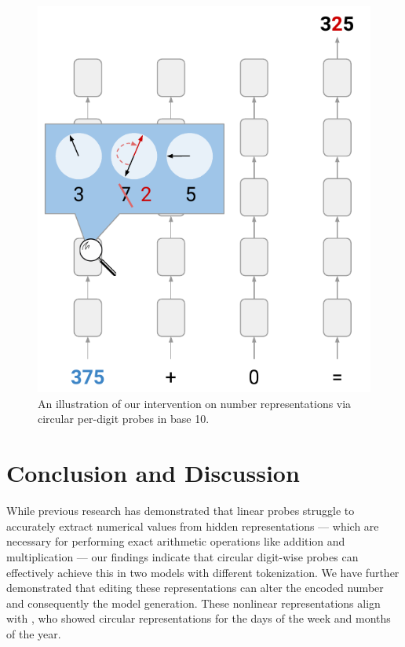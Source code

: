 \documentclass[11pt]{article}
\begin{document}
\begin{figure}[t]
\setlength\belowcaptionskip{-8pt}
\centering
\includegraphics[scale=0.42]{intervention_v1.pdf}
\caption{An illustration of our intervention on number representations via circular per-digit probes in base 10.}
\label{fig:intervention}
\end{figure}



\section{Conclusion and Discussion}
\label{sec:discussion}

While previous research has demonstrated that linear probes struggle to accurately extract numerical values from hidden representations --- which are necessary for performing exact arithmetic operations like addition and multiplication --- our findings indicate that circular digit-wise probes can effectively achieve this in two models with different tokenization.
We have further demonstrated that editing these representations can alter the encoded number and consequently the model generation. 
These nonlinear representations align with \citet{engels2024languagemodelfeatureslinear}, who showed circular representations for the days of the week and months of the year.
\end{document}
